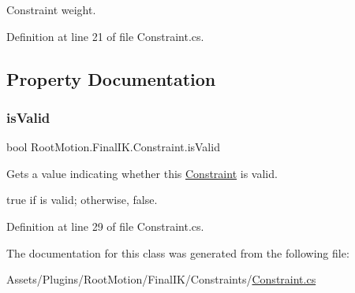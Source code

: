 Constraint weight. 



Definition at line 21 of file Constraint.\+cs.



\subsection{Property Documentation}
\mbox{\label{class_root_motion_1_1_final_i_k_1_1_constraint_a7ad56793e1a01e5b5b849011cb629300}} 
\subsubsection{\texorpdfstring{is\+Valid}{isValid}}
{\footnotesize\ttfamily bool Root\+Motion.\+Final\+I\+K.\+Constraint.\+is\+Valid\hspace{0.3cm}{\ttfamily [get]}}



Gets a value indicating whether this \mbox{\hyperlink{class_root_motion_1_1_final_i_k_1_1_constraint}{Constraint}} is valid. 

{\ttfamily true} if is valid; otherwise, {\ttfamily false}. 

Definition at line 29 of file Constraint.\+cs.



The documentation for this class was generated from the following file\+:\begin{DoxyCompactItemize}
\item 
Assets/\+Plugins/\+Root\+Motion/\+Final\+I\+K/\+Constraints/\mbox{\hyperlink{_constraint_8cs}{Constraint.\+cs}}\end{DoxyCompactItemize}
